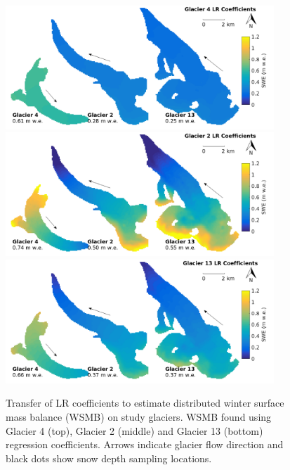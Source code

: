 \documentclass[12pt]{article}
\newcommand{\topomap}{Arrows indicate glacier flow direction and black dots show snow depth sampling locations. }
\begin{document}
\pagebreak
\begin{figure}[H]
	\centering
	\includegraphics[width =0.9\textwidth]{MapTransferabilityG4Coeffs.png}\\
	\includegraphics[width =0.9\textwidth]{MapTransferabilityG2Coeffs.png}\\
	\includegraphics[width =0.9\textwidth]{MapTransferabilityG13Coeffs.png}\\
	\caption{Transfer of LR coefficients to estimate distributed winter surface mass balance (WSMB) on study glaciers. WSMB found using Glacier 4 (top), Glacier 2 (middle) and Glacier 13 (bottom) regression coefficients.  \topomap}
	\label{fig:MapTransferabilityS4}
\end{figure}

\end{document}
